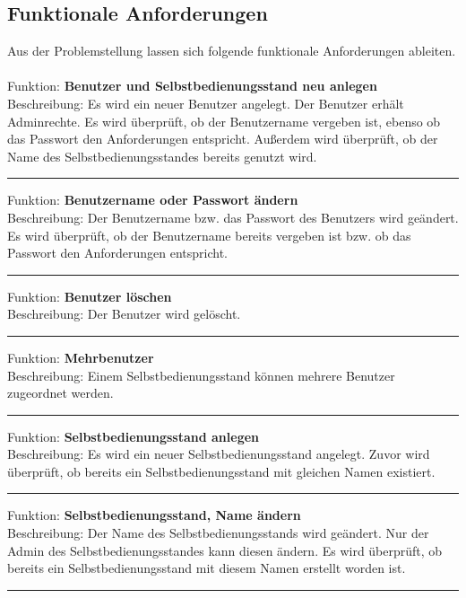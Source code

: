 \subsection{Funktionale Anforderungen}\label{funktionale_Anforderungen}

Aus der Problemstellung lassen sich folgende funktionale Anforderungen ableiten.
\\
\\
Funktion: \textbf{Benutzer und Selbstbedienungsstand neu anlegen}\\
Beschreibung: Es wird ein neuer Benutzer angelegt. Der Benutzer erhält Adminrechte. Es wird überprüft, ob der Benutzername vergeben ist, ebenso ob das Passwort den Anforderungen entspricht. Außerdem wird überprüft, ob der Name des Selbstbedienungsstandes bereits genutzt wird.


\noindent\rule{\textwidth}{1pt}


Funktion: \textbf{Benutzername oder Passwort ändern}\\
Beschreibung: Der Benutzername bzw. das Passwort des Benutzers wird geändert. Es wird überprüft, ob der Benutzername bereits vergeben ist bzw. ob das Passwort den Anforderungen entspricht.


\noindent\rule{\textwidth}{1pt}

Funktion: \textbf{Benutzer löschen}\\
Beschreibung: Der Benutzer wird gelöscht.

\noindent\rule{\textwidth}{1pt}

Funktion: \textbf{Mehrbenutzer}\\
Beschreibung: Einem Selbstbedienungsstand können mehrere Benutzer zugeordnet werden. 


\noindent\rule{\textwidth}{1pt}

Funktion: \textbf{Selbstbedienungsstand anlegen}\\
Beschreibung: Es wird ein neuer Selbstbedienungsstand angelegt. Zuvor wird überprüft, ob bereits ein Selbstbedienungsstand mit gleichen Namen existiert.


\noindent\rule{\textwidth}{1pt}

Funktion: \textbf{Selbstbedienungsstand, Name ändern}\\
Beschreibung: Der Name des Selbstbedienungsstands wird geändert. Nur der Admin des Selbstbedienungsstandes kann diesen ändern. Es wird überprüft, ob bereits ein Selbstbedienungsstand mit diesem Namen erstellt worden ist.


\noindent\rule{\textwidth}{1pt}



